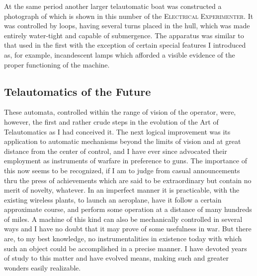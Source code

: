 \documentclass[a4paper,12pt,english,twoside,openright]{memoir}
\begin{document}
At the same period another larger telautomatic boat was constructed a photograph of which is 
shown in this number of the \textsc{Electrical Experimenter}.  It was controlled by loops, having 
several turns placed in the hull, which was made entirely water-tight and capable of 
submergence.  The apparatus was similar to that used in the first with the exception of certain 
special features I introduced as, for example, incandescent lamps which afforded a visible 
evidence of the proper functioning of the machine.  

\subsection{Telautomatics of the Future}
These automata, controlled within the range of vision of the operator, were, however, the first and 
rather crude steps in the evolution of the Art of Telautomatics as I had conceived it.  The next 
logical improvement was its application to automatic mechanisms beyond the limits of vision and 
at great distance from the center of control, and I have ever since advocated their employment as 
instruments of warfare in preference to guns.  The importance of this now seems to be 
recognized, if I am to judge from casual announcements thru the press of achievements which 
are said to be extraordinary but contain no merit of novelty, whatever.  In an imperfect manner it 
is practicable, with the existing wireless plants, to launch an aeroplane, have it follow a certain 
approximate course, and perform some operation at a distance of many hundreds of miles.  A 
machine of this kind can also be mechanically controlled in several ways and I have no doubt that 
it may prove of some usefulness in war.  But there are, to my best knowledge, no 
instrumentalities in existence today with which such an object could be accomplished in a precise 
manner.  I have devoted years of study to this matter and have evolved means, making such and 
greater wonders easily realizable.  
\end{document}
